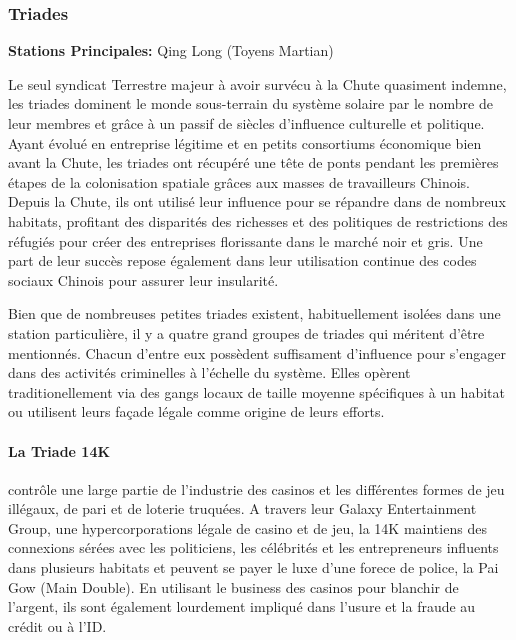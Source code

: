                                              \subsubsection{Triades} \label{sec:triads} 

                                             \textbf{Stations Principales:} Qing Long (Toyens Martian) 

                                             Le seul syndicat Terrestre majeur à avoir survécu à la Chute quasiment indemne, les triades dominent le monde sous-terrain du système solaire par le nombre de leur membres et grâce à un passif de siècles d'influence culturelle et politique. Ayant évolué en entreprise légitime et en petits consortiums économique bien avant la Chute, les triades ont récupéré une tête de ponts pendant les premières étapes de la colonisation spatiale grâces aux masses de travailleurs Chinois. Depuis la Chute, ils ont utilisé leur influence pour se répandre dans de nombreux habitats, profitant des disparités des richesses et des politiques de restrictions des réfugiés pour créer des entreprises florissante dans le marché noir et gris. Une part de leur succès repose également dans leur utilisation continue des codes sociaux Chinois pour assurer leur insularité. 

                                             Bien que de nombreuses petites triades existent, habituellement isolées dans une station particulière, il y a quatre grand groupes de triades qui méritent d'être mentionnés. Chacun d'entre eux possèdent suffisament d'influence pour s'engager dans des activités criminelles à l'échelle du système. Elles opèrent traditionellement via des gangs locaux de taille moyenne spécifiques à un habitat ou utilisent leurs façade légale comme origine de leurs efforts. 

                                             \paragraph{La Triade 14K} \label{sec:14k-triad} contrôle une large partie de l'industrie des casinos et les différentes formes de jeu illégaux, de pari et de loterie truquées. A travers leur Galaxy Entertainment Group, une hypercorporations légale de casino et de jeu, la 14K maintiens des connexions sérées avec les politiciens, les célébrités et les entrepreneurs influents dans plusieurs habitats et peuvent se payer le luxe d'une forece de police, la Pai Gow (Main Double). En utilisant le business des casinos pour blanchir de l'argent, ils sont également lourdement impliqué dans l'usure et la fraude au crédit ou à l'ID. 

